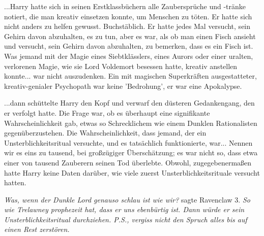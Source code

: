 ...Harry hatte sich in seinen Erstklassbüchern alle Zaubersprüche und -tränke
notiert, die man kreativ einsetzen konnte, um Menschen zu töten. Er hatte sich
nicht anders zu helfen gewusst. Buchstäblich. Er hatte jedes Mal versucht, sein
Gehirn davon abzuhalten, es zu tun, aber es war, als ob man einen Fisch ansieht
und versucht, sein Gehirn davon abzuhalten, zu bemerken, dass es ein Fisch ist.
Was jemand mit der Magie eines Siebtklässlers, eines Aurors oder einer uralten,
verlorenen Magie, wie sie Lord Voldemort besessen hatte, kreativ anstellen
konnte... war nicht auszudenken. Ein mit magischen Superkräften ausgestatteter,
kreativ-genialer Psychopath war keine 'Bedrohung', er war eine Apokalypse.

...dann schüttelte Harry den Kopf und verwarf den düsteren Gedankengang, den er
verfolgt hatte. Die Frage war, ob es überhaupt eine signifikante
Wahrscheinlichkeit gab, etwas so Schrecklichem wie einem Dunklen Rationalisten
gegenüberzustehen. Die Wahrscheinlichkeit, dass jemand, der ein
Unsterblichkeitsritual versuchte, und es tatsächlich funktionierte, war...
Nennen wir es eins zu tausend, bei großzügiger Überschätzung; es war nicht so,
dass etwa einer von tausend Zauberern seinen Tod überlebte. Obwohl,
zugegebenermaßen hatte Harry keine Daten darüber, wie viele zuerst
Unsterblichkeitsrituale versucht hatten.

\emph{Was, wenn der Dunkle Lord genauso schlau ist wie wir?} sagte Ravenclaw 3.
\emph{So wie Trelawney prophezeit hat, dass er uns ebenbürtig ist. Dann würde er
sein Unsterblichkeitsritual durchziehen. P.S., vergiss nicht den Spruch \glqq
alles bis auf einen Rest zerstören\grqq{}.}

